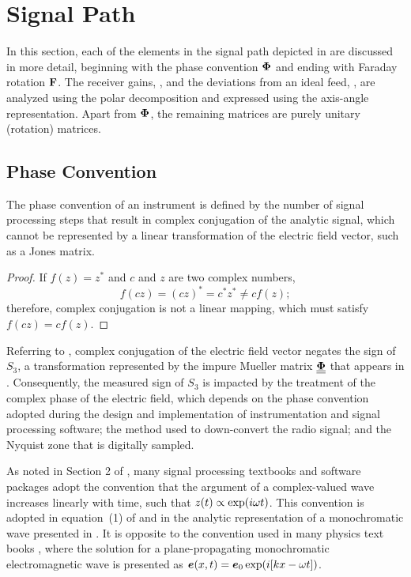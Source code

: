 \section{Signal Path}
\label{sec:signal_path}

In this section, each of the elements in the signal path depicted in  are discussed in more detail, beginning with the phase convention $\mbox{\boldmath $\Phi$}$ and ending with Faraday rotation $\bf F$.
%
%
The receiver gains, , and the deviations from an ideal feed, , are analyzed using the polar decomposition and expressed using the axis-angle representation.
%
Apart from $\mbox{\boldmath $\Phi$}$, the remaining  matrices are purely unitary (rotation) matrices.


\subsection{ Phase Convention }
\label{sec:conjugation}

The phase convention of an instrument is defined by the number of
signal processing steps that result in complex conjugation of the analytic signal, which cannot be represented by a linear transformation of the electric field vector, such as a Jones matrix.

\begin{proof}
If $f(z)=z^*$ and $c$ and $z$ are two complex numbers, $$f(cz) = (cz)^* = c^*z^* \neq cf(z);$$
therefore, complex conjugation is not a linear mapping, which must satisfy
$f(cz)=cf(z)$.
\end{proof}

Referring to , complex conjugation of the electric field vector negates the sign of $S_3$, 
%
a transformation represented by the impure Mueller matrix $\underline{\underline{{\bf \Phi}}}$ that appears in .
%
Consequently, the measured sign of $S_3$ is impacted by the treatment of the 
complex phase of the electric field, which depends on
%
the phase convention adopted during the design and implementation 
of instrumentation and signal processing software;
the method used to down-convert the radio signal; and
the Nyquist zone that is digitally sampled.

As noted in Section 2 of \cite{vmjr10}, many signal processing textbooks and software packages adopt the convention that the argument of a complex-valued wave increases linearly with time, such that $z(t) \propto \exp(i\omega t)$.
%
This convention is adopted in equation~(1) of \citet{sto52} and in the analytic representation of a monochromatic wave presented in .
%
It is opposite to the convention used in many physics text books \citep[e.g.,][]{bw80},
where the solution for a plane-propagating monochromatic electromagnetic wave is 
presented as $\mbox{\boldmath $e$}(x,t) = \mbox{\boldmath $e$}_0\exp(i [kx - \omega t])$.

